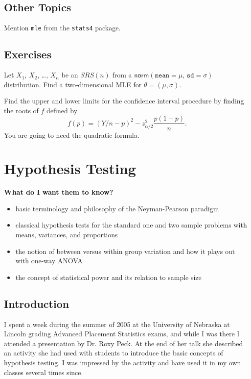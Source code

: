 \documentclass[captions=tableheading]{scrbook}
\begin{document}
\section{Other Topics}
\label{sec-9-8}
\label{sec-Other-Topics}


Mention \texttt{mle} from the \texttt{stats4} package.

\newpage{}
\section{Exercises}
\label{sec-9-9}

\setcounter{thm}{0}

\begin{xca}
Let \(X_{1}\), \(X_{2}\), \ldots{}, \(X_{n}\) be an \(SRS(n)\) from a \(\mathsf{norm}(\mathtt{mean}=\mu,\,\mathtt{sd}=\sigma)\) distribution. Find a two-dimensional MLE for \(\theta=(\mu,\sigma)\).
\end{xca}

\begin{xca}
Find the upper and lower limits for the confidence interval procedure by finding the roots of \(f\) defined by 
\[
f(p)=\left(Y/n-p\right)^{2}-z_{\alpha/2}^{2}\frac{p(1-p)}{n}.
\]
You are going to need the quadratic formula.
\end{xca}
\chapter{Hypothesis Testing}
\label{sec-10}
\label{cha-Hypothesis-Testing}


\textbf{What do I want them to know?}
\begin{itemize}
\item basic terminology and philosophy of the Neyman-Pearson paradigm
\item classical hypothesis tests for the standard one and two sample problems with means, variances, and proportions
\item the notion of between versus within group variation and how it plays out with one-way ANOVA
\item the concept of statistical power and its relation to sample size
\end{itemize}
\section{Introduction}
\label{sec-10-1}
\label{sec-Introduction-Hypothesis}


I spent a week during the summer of 2005 at the University of Nebraska at Lincoln grading Advanced Placement Statistics exams, and while I was there I attended a presentation by Dr. Roxy Peck. At the end of her talk she described an activity she had used with students to introduce the basic concepts of hypothesis testing. I was impressed by the activity and have used it in my own classes several times since.
\end{document}
